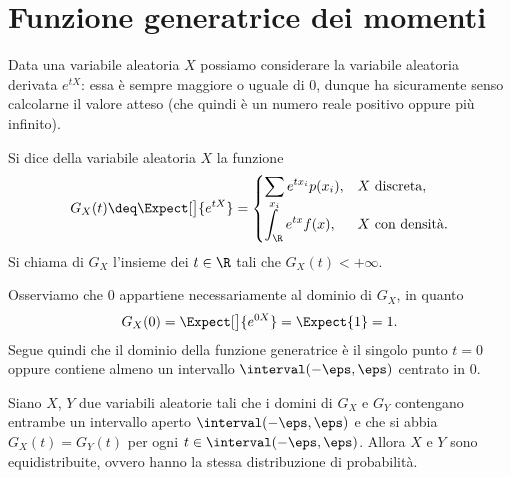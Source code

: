 \section{Funzione generatrice dei momenti}

Data una variabile aleatoria $X$ possiamo considerare la variabile aleatoria derivata $e^{tX}$: essa è sempre maggiore o uguale di $0$, dunque ha sicuramente senso calcolarne il valore atteso (che quindi è un numero reale positivo oppure più infinito).

\begin{definition}
    Si dice  della variabile aleatoria $X$ la funzione \[
        G_X(t) \deq \Expect[\big]{e^{tX}} = \begin{cases}
            \displaystyle \sum_{x_i} e^{tx_i}p(x_i), &X \text{ discreta},\\
            \displaystyle \int_\R e^{tx}f(x), &X \text{ con densità}.
        \end{cases}
    \] Si chiama  di $G_X$ l'insieme dei $t \in \R$ tali che $G_X(t) < +\infty$.
\end{definition}

Osserviamo che $0$ appartiene necessariamente al dominio di $G_X$, in quanto \[
    G_X(0) = \Expect[\big]{e^{0X}} = \Expect{1} = 1. 
\] Segue quindi che il dominio della funzione generatrice è il singolo punto $t = 0$ oppure contiene almeno un intervallo $\interval({-\eps, \eps})$ centrato in $0$.

\begin{theorem}
    Siano $X$, $Y$ due variabili aleatorie tali che i domini di $G_X$ e $G_Y$ contengano entrambe un intervallo aperto $\interval({-\eps, \eps})$ e che si abbia $G_X(t) = G_Y(t)$ per ogni $t \in \interval({-\eps, \eps})$. Allora $X$ e $Y$ sono equidistribuite, ovvero hanno la stessa distribuzione di probabilità.
\end{theorem}

